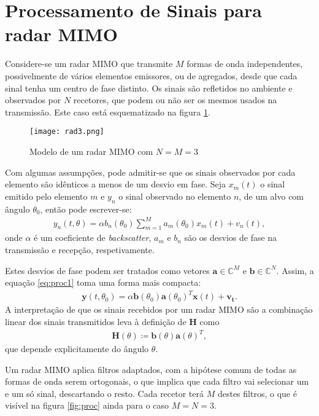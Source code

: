 \documentclass[purist,portuguese]{ist-report}
\begin{document}

\section{Processamento de Sinais para radar MIMO}

Considere-se um radar MIMO que transmite $M$ formas de onda independentes, possivelmente de vários elementos emissores, ou de agregados, desde que cada sinal tenha um centro de fase distinto.
Os sinais são refletidos no ambiente e observados por $N$ recetores, que podem ou não ser os mesmos usados na transmissão.
Este caso está esquematizado na figura \ref{fig:rad3}.

\begin{figure}[hp]
  \centering
  \texttt{[image: rad3.png]}
  \caption{Modelo de um radar MIMO com $N=M=3$}
  \label{fig:rad3}
\end{figure}

Com algumas assumpções, pode admitir-se que os sinais observados por cada elemento são idênticos a menos de um desvio em fase.
Seja $x_m(t)$ o sinal emitido pelo elemento $m$ e $y_n$ o sinal observado no elemento $n$, de um alvo com ângulo $\theta_0$, então pode escrever-se:
\begin{align}
  y_n(t,\theta) = \alpha b_n(\theta_0) \sum_{m=1}^{M}a_m(\theta_0)x_m(t) + v_n(t),
  \label{eq:proc1}
\end{align}
onde $\alpha$ é um coeficiente de \textit{backscatter}, $a_m$ e $b_n$ são os desvios de fase na transmissão e recepção, respetivamente.

Estes desvios de fase podem ser tratados como vetores $\mathbf{a} \in \mathbb{C}^M$ e $\mathbf{b} \in \mathbb{C}^N$.
Assim, a equação \ref{eq:proc1} toma uma forma mais compacta:
\begin{align}
  \mathbf{y}(t,\theta_0) = \alpha\mathbf{b}(\theta_0)\mathbf{a}(\theta_0)^T\mathbf{x}(t)+\mathbf{v_t}.
  \label{eq:radc}
\end{align}
A interpretação de que os sinais recebidos por um radar MIMO são a combinação linear dos sinais transmitidos leva à definição de $\mathbf{H}$ como
\begin{align}
  \mathbf{H}(\theta) \coloneqq \mathbf{b}(\theta)\mathbf{a}(\theta)^T,
  \label{eq:H}
\end{align}
que depende explicitamente do ângulo $\theta$.

Um radar MIMO aplica filtros adaptados, com a hipótese comum de todas as formas de onda serem ortogonais, o que implica que cada filtro vai selecionar um e um só sinal, descartando o resto.
Cada recetor terá $M$ destes filtros, o que é visível na figura \ref{fig:proc} ainda para o caso $M=N=3$.
\end{document}
